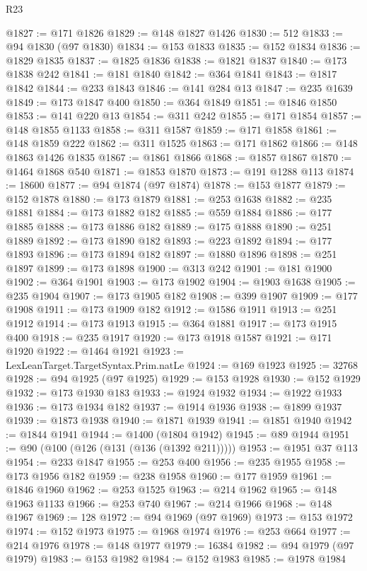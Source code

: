 \begin{lexlean}{R23}
\begin{coremodule}
@1827 := @171 @1826
@1829 := @148 @1827 @1426
@1830 := 512
@1833 := @94 @1830 (@97 @1830)
@1834 := @153 @1833
@1835 := @152 @1834
@1836 := @1829 @1835
@1837 := @1825 @1836
@1838 := @1821 @1837
@1840 := @173 @1838 @242
@1841 := @181 @1840
@1842 := @364 @1841
@1843 := @1817 @1842
@1844 := @233 @1843
@1846 := @141 @284 @13
@1847 := @235 @1639
@1849 := @173 @1847 @400
@1850 := @364 @1849
@1851 := @1846 @1850
@1853 := @141 @220 @13
@1854 := @311 @242
@1855 := @171 @1854
@1857 := @148 @1855 @1133
@1858 := @311 @1587
@1859 := @171 @1858
@1861 := @148 @1859 @222
@1862 := @311 @1525
@1863 := @171 @1862
@1866 := @148 @1863 @1426 @1835
@1867 := @1861 @1866
@1868 := @1857 @1867
@1870 := @1464 @1868 @540
@1871 := @1853 @1870
@1873 := @191 @1288 @113
@1874 := 18600
@1877 := @94 @1874 (@97 @1874)
@1878 := @153 @1877
@1879 := @152 @1878
@1880 := @173 @1879
@1881 := @253 @1638
@1882 := @235 @1881
@1884 := @173 @1882 @182
@1885 := @559 @1884
@1886 := @177 @1885
@1888 := @173 @1886 @182
@1889 := @175 @1888
@1890 := @251 @1889
@1892 := @173 @1890 @182
@1893 := @223 @1892
@1894 := @177 @1893
@1896 := @173 @1894 @182
@1897 := @1880 @1896
@1898 := @251 @1897
@1899 := @173 @1898
@1900 := @313 @242
@1901 := @181 @1900
@1902 := @364 @1901
@1903 := @173 @1902
@1904 := @1903 @1638
@1905 := @235 @1904
@1907 := @173 @1905 @182
@1908 := @399 @1907
@1909 := @177 @1908
@1911 := @173 @1909 @182
@1912 := @1586 @1911
@1913 := @251 @1912
@1914 := @173 @1913
@1915 := @364 @1881
@1917 := @173 @1915 @400
@1918 := @235 @1917
@1920 := @173 @1918 @1587
@1921 := @171 @1920
@1922 := @1464 @1921
@1923 := LexLeanTarget.TargetSyntax.Prim.natLe
@1924 := @169 @1923
@1925 := 32768
@1928 := @94 @1925 (@97 @1925)
@1929 := @153 @1928
@1930 := @152 @1929
@1932 := @173 @1930 @183
@1933 := @1924 @1932
@1934 := @1922 @1933
@1936 := @173 @1934 @182
@1937 := @1914 @1936
@1938 := @1899 @1937
@1939 := @1873 @1938
@1940 := @1871 @1939
@1941 := @1851 @1940
@1942 := @1844 @1941
@1944 := @1400 (@1804 @1942)
@1945 := @89 @1944
@1951 := @90 (@100 (@126 (@131 (@136 (@1392 @211)))))
@1953 := @1951 @37 @113
@1954 := @233 @1847
@1955 := @253 @400
@1956 := @235 @1955
@1958 := @173 @1956 @182
@1959 := @238 @1958
@1960 := @177 @1959
@1961 := @1846 @1960
@1962 := @253 @1525
@1963 := @214 @1962
@1965 := @148 @1963 @1133
@1966 := @253 @740
@1967 := @214 @1966
@1968 := @148 @1967
@1969 := 128
@1972 := @94 @1969 (@97 @1969)
@1973 := @153 @1972
@1974 := @152 @1973
@1975 := @1968 @1974
@1976 := @253 @664
@1977 := @214 @1976
@1978 := @148 @1977
@1979 := 16384
@1982 := @94 @1979 (@97 @1979)
@1983 := @153 @1982
@1984 := @152 @1983
@1985 := @1978 @1984

\end{coremodule}
\end{lexlean}
